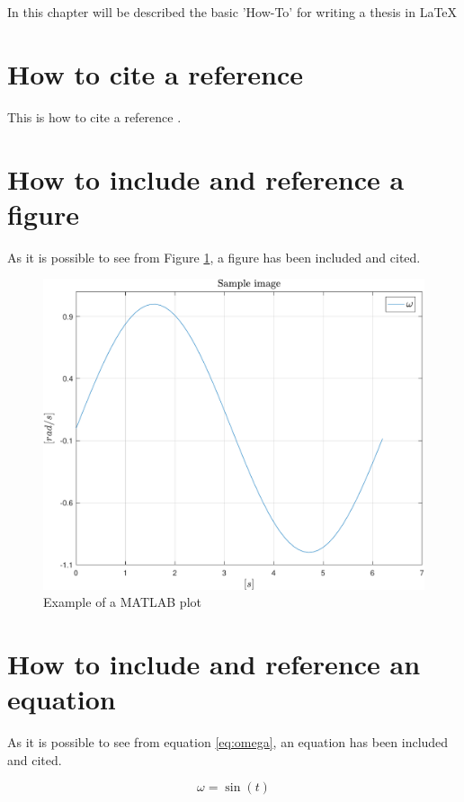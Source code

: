 In this chapter will be described the basic 'How-To' for writing a thesis in \LaTeX

\section{How to cite a reference} 
This is how to cite a reference \cite{Dijkstra68Letters}.

\section{How to include and reference a figure}
As it is possible to see from Figure \ref{fig:sample_figure}, a figure has been included and cited.

\begin{figure}[htbp]
\centering
\includegraphics[width = \textwidth]{chapters/chapter-1/figures/sample_figure.pdf}
\caption{Example of a MATLAB plot}
\label{fig:sample_figure}
\end{figure}

\section{How to include and reference an equation}
As it is possible to see from equation \eqref{eq:omega}, an equation has been included and cited.

\begin{equation}
\omega = \sin(t)
\label{eq:omega}
\end{equation}

